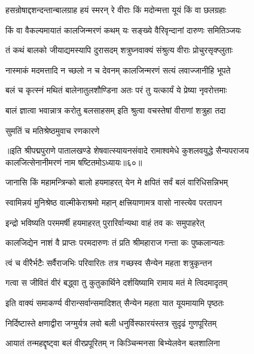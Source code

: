 \twolineshloka
{हसन्रोषाद्दशन्दन्तान्बालग्राह हयं स्मरन्}
{रे वीराः किं मदोन्मत्ता यूयं किं वा छलग्रहाः}%

\twolineshloka
{किं वा वैकल्यमायातं कालजिन्मरणं कथम्}
{यः सङ्ख्ये वैरिवृन्दानां दारुणः समितिञ्जयः}%

\twolineshloka
{तं कथं बालको जीयाद्यमस्यापि दुरासदम्}
{शत्रुघ्नवाक्यं संश्रुत्य वीराः प्रोचुरसृक्प्लुताः}%

\twolineshloka
{नास्माकं मदमत्तादि न च्छलो न च देवनम्}
{कालजिन्मरणं सत्यं लवाज्जानीहि भूपते}%

\twolineshloka
{बलं च कृत्स्नं मथितं बालेनातुलशौण्डिना}
{अतः परं तु यत्कार्यं ये प्रेष्या नृवरोत्तमाः}%

\twolineshloka
{बालं ज्ञात्वा भवान्नात्र करोतु बलसाहसम्}
{इति श्रुत्वा वचस्तेषां वीराणां शत्रुहा तदा}%

\onelineshloka
{सुमतिं च मतिश्रेष्ठमुवाच रणकारणे}%

॥इति श्रीपद्मपुराणे पातालखण्डे शेषवात्स्यायनसंवादे रामाश्वमेधे कुशलवयुद्धे सैन्यपराजय कालजित्सेनानीमरणं नाम षष्टितमोऽध्यायः॥६०॥



\twolineshloka
{जानासि किं महामन्त्रिन्को बालो हयमाहरत्}
{येन मे क्षपितं सर्वं बलं वारिधिसन्निभम्}%


\twolineshloka
{स्वामिन्नयं मुनिश्रेष्ठ वाल्मीकेराश्रमो महान्}
{क्षत्त्रियाणामत्र वासो नास्त्येव परतापन}%

\twolineshloka
{इन्द्रो भविष्यति परममर्षी हयमाहरत्}
{पुरारिर्वान्यथा वाहं तव कः समुपाहरेत्}%

\twolineshloka
{कालजिद्येन नाशं वै प्राप्तः परमदारुणः}
{तं प्रति श्रीमहाराज गन्ता कः पुष्कलान्यतः}%

\twolineshloka
{त्वं च वीरैर्भटैः सर्वैराजभिः परिवारितः}
{तत्र गच्छस्व सैन्येन महता शत्रुकृन्तन}%

\twolineshloka
{गत्वा स जीवितं वीरं बद्ध्वा तु कुतुकार्थिने}
{दर्शयिष्यामि रामाय मतं मे त्विदमादृतम्}%

\twolineshloka
{इति वाक्यं समाकर्ण्य वीरान्सर्वान्समादिशत्}
{सैन्येन महता यात यूयमायामि पृष्ठतः}%

\twolineshloka
{निर्दिष्टास्ते क्षणाद्वीरा जग्मुर्यत्र लवो बली}
{धनुर्विस्फारयंस्तत्र सुदृढं गुणपूरितम्}%

\twolineshloka
{आयातं तन्महद्दृष्ट्वा बलं वीरप्रपूरितम्}
{न किञ्चिन्मनसा बिभ्येलवेन बलशालिना}%

